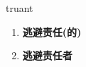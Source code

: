 
\begin{frame}
{\huge truant}
\begin{center}
\begin{enumerate}\Large
  \item \textbf{逃避责任(的)}
  \item \textbf{逃避责任者}
\end{enumerate}
\end{center}
\end{frame}
